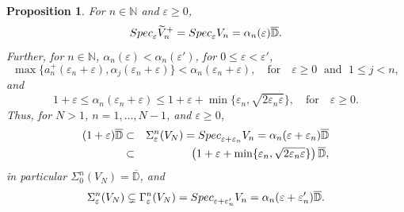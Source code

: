 \documentclass[preprint,1p,11pt]{elsarticle}
\newcommand\D{{\mathbb D}}
\newcommand\N{{\mathbb N}}
\newcommand\eps{{\varepsilon}}
\newcommand\Specn{{\rm Spec}}   %
\newtheorem{proposition}[theorem]{Proposition}
\numberwithin{equation}{section}   %
\numberwithin{figure}{section}  %
\begin{document}
\begin{proposition} \label{prop:VN}
For $n\in \N$ and $\eps\geq 0$,
\begin{equation} \label{eq:PiCh}
\Specn_{\eps} \widetilde V^{+}_n = \Specn_{\eps}  V_n  = \alpha_n(\eps)\overline{\D}.
\end{equation}
Further, for $n\in \N$, $\alpha_n(\eps) <\alpha_n(\eps')$, for $0\leq \eps<\eps'$, 
\begin{equation} \label{eq:maxan}
\max\{a_n^+(\eps_n+\eps),\alpha_j(\eps_n+\eps)\} <  \alpha_n(\eps_n+\eps),  \quad \mbox{for}\quad \eps\geq 0 \;\mbox{ and }\; 1\leq j<n,
\end{equation}
and 
\begin{equation} \label{eq:bounds}
1+\eps\leq \alpha_n(\eps_n+\eps) \leq 1+\eps+\min\{\eps_n,\sqrt{2\eps_n\eps}\}, \quad \mbox{for}\quad \eps\geq 0.
\end{equation}
Thus, for $N>1$, $n=1,\ldots,N-1$, and $\eps\geq0$,
\begin{eqnarray} \nonumber
(1+\eps)\overline{\D} &\subset &\Sigma_\eps^n(V_N) = \Specn_{\eps+\eps_n} V_n  = \alpha_n(\eps+\eps_n)\overline{\D}\\  \label{eq:inclus2}
&\subset &\left(1+\eps+\min\{\eps_n,\sqrt{2\eps_n\eps}\}\right) \overline{\D}, 
\end{eqnarray}
in particular $\Sigma_0^n(V_N)=\overline{\D}$, and
\begin{equation} \label{eq:inclus}
\Sigma_\eps^n(V_N) \subsetneq \Gamma_\eps^n(V_N) =  \Specn_{\eps+\eps'_n} V_n  = \alpha_n(\eps+\eps'_n)\overline{\D}.
\end{equation}
\end{proposition}
\end{document}
